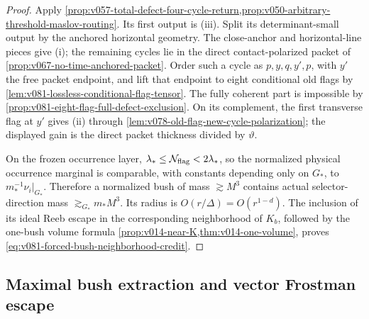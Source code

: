 \documentclass[10pt]{article}
\begin{document}
\begin{proof}
Apply
\cref{prop:v057-total-defect-four-cycle-return,prop:v050-arbitrary-threshold-maslov-routing}.
Its first output is \textnormal{(iii)}.  Split its determinant-small output by the anchored
horizontal geometry.  The close-anchor and horizontal-line pieces give \textnormal{(i)}; the
remaining cycles lie in the direct contact-polarized packet of
\cref{prop:v067-no-time-anchored-packet}.  Order such a cycle as \(p,y,q,y',p\), with \(y'\) the
free packet endpoint, and lift that endpoint to eight conditional old flags by
\cref{lem:v081-lossless-conditional-flag-tensor}.  The fully coherent part is impossible by
\cref{prop:v081-eight-flag-full-defect-exclusion}.  On its complement, the first transverse flag at
\(y'\) gives \textnormal{(ii)} through
\cref{lem:v078-old-flag-new-cycle-polarization}; the displayed gain is the direct packet thickness
divided by \(\vartheta\).

On the frozen occurrence layer,
\(\lambda_*\le\mathcal N_{\rm flag}<2\lambda_*\), so the normalized physical occurrence marginal
is comparable, with constants depending only on \(G_*\), to
\(m_*^{-1}\nu_i|_{G_*}\).  Therefore a normalized bush of mass \(\gtrsim M^3\) contains actual
selector-direction mass \(\gtrsim_{G_*}m_*M^3\).  Its radius is
\(O(r/\Delta)=O(r^{1-d})\).  The inclusion of its ideal Reeb escape in the corresponding
neighborhood of \(K_b\), followed by the one-bush volume formula
\cref{prop:v014-near-K,thm:v014-one-volume}, proves
\eqref{eq:v081-forced-bush-neighborhood-credit}.
\end{proof}

\subsection{Maximal bush extraction and vector Frostman escape}
\end{document}
